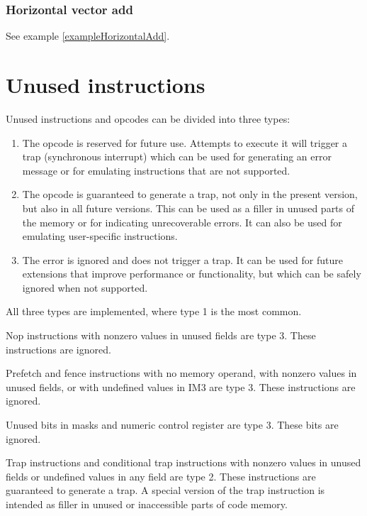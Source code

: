 \documentclass[forwardcom.tex]{subfiles}
\begin{document}
\subsubsection{Horizontal vector add} \label{horizontalVectorAdd}
See example \ref{exampleHorizontalAdd}.
\vspace{2mm}

\section{Unused instructions} \label{unusedInstructions}
Unused instructions and opcodes can be divided into three types:

\begin{enumerate}
\item The opcode is reserved for future use. Attempts to execute it will trigger a trap (synchronous interrupt) which can be used for generating an error message or for emulating instructions that are not supported.
\item The opcode is guaranteed to generate a trap, not only in the present version, but also in all future versions. This can be used as a filler in unused parts of the memory or for indicating unrecoverable errors. It can also be used for emulating user-specific instructions.
\item The error is ignored and does not trigger a trap. It can be used for future extensions that improve performance or functionality, but which can be safely ignored when not supported.
\end{enumerate}

All three types are implemented, where type 1 is the most common.
\vspace{2mm}

Nop instructions with nonzero values in unused fields are type 3. These instructions are ignored.
\vspace{2mm}

Prefetch and fence instructions with no memory operand, with nonzero values in unused fields, or with undefined values in IM3 are type 3. These instructions are ignored.
\vspace{2mm}

Unused bits in masks and numeric control register are type 3. These bits are ignored.
\vspace{2mm}

Trap instructions and conditional trap instructions with nonzero values in unused fields or undefined values in any field are type 2. These instructions are guaranteed to generate a trap. A special version of the trap instruction is intended as filler in unused or inaccessible parts of code memory.
\vspace{2mm}
\end{document}
